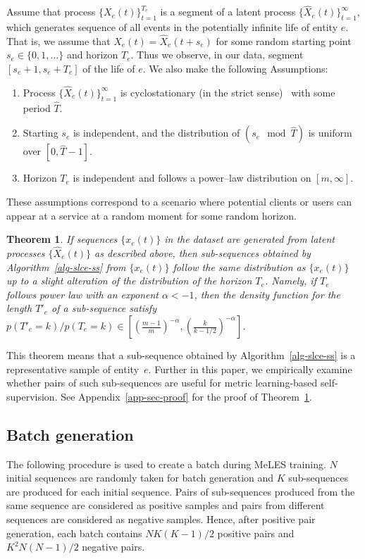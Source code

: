 \documentclass{article}
\newtheorem{thm}{Theorem}
\begin{document}
Assume that process $\{X_e(t)\}_{t=1}^{T_e}$ is a segment of a latent process $\{\widehat{X}_e(t)\}_{t=1}^{\infty}$, which generates sequence of all events in the potentially infinite life of entity $e$. That is, we assume that $X_e(t)=\widehat{X}_e(t+s_e)$ for some random starting point $s_e\in \{0,1,\ldots\}$ and horizon $T_e$. Thus we observe, in our data, segment $[s_e+1,s_e+T_e]$ of the life of $e$. We also make the following Assumptions:
\begin{enumerate}
    \item Process $\{\widehat{X}_e(t)\}_{t=1}^{\infty}$ is cyclostationary (in the strict sense)~\cite{Gardner2006Cyclostationarity} with some period $\widehat{T}$.
    \item Starting $s_e$ is independent, and the distribution of $(s_e \mod \widehat{T})$ is uniform over $[0,\widehat{T}-1]$.
    \item Horizon $T_e$ is independent and follows a power--law distribution on $[m,\infty]$.
\end{enumerate}
These assumptions correspond to a scenario where potential clients or users can appear at a service at a random moment for some random horizon.    %
\begin{thm}\label{thm:distribution}
If sequences $\{x_e(t)\}$ in the dataset are generated from latent processes $\{\widehat{X}_e(t)\}$ as described above, then sub-sequences obtained by Algorithm~\ref{alg-slce-ss} from $\{x_e(t)\}$ follow the same distribution as $\{x_e(t)\}$ up to a slight alteration of the distribution of the horizon $T_e$. Namely, if $T_e$ follows power law with an exponent $\alpha <-1$, then the density function for the length $T'_e$ of a sub-sequence satisfy $p(T'_e=k)/p(T_e=k)\in [(\frac{m-1}{m})^{-\alpha},(\frac{k}{k-1/2})^{-\alpha}]$.
\end{thm}
This theorem means that a sub-sequence obtained by Algorithm~\ref{alg-slce-ss} is a representative sample of entity~$e$. Further in this paper, we empirically examine whether pairs of such sub-sequences are useful for metric learning-based self-supervision. See Appendix~\ref{app-sec-proof} for the proof of Theorem~\ref{thm:distribution}.

\subsection{Batch generation}

The following procedure is used to create a batch during MeLES training. $N$ initial sequences are randomly taken for batch generation and $K$ sub-sequences are produced for each initial sequence. Pairs of sub-sequences produced from the same sequence are considered as positive samples and pairs from different sequences are considered as negative samples. Hence, after positive pair generation, each batch contains %
$NK(K-1)/2$ positive pairs and $K^2N(N - 1)/2$ negative pairs.
\end{document}
